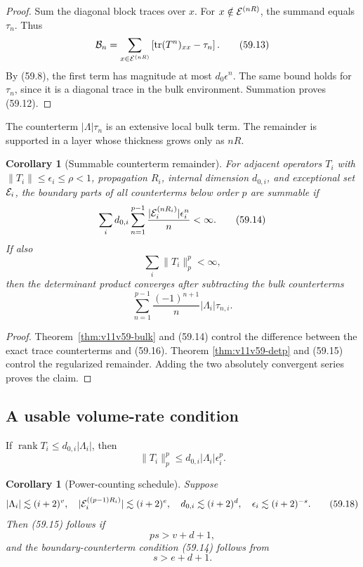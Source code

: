\documentclass[11pt]{article}
\newtheorem{corollary}[theorem]{Corollary}
\begin{document}
\begin{proof}
Sum the diagonal block traces over \(x\).  For
\(x\notin{\cal E}^{(nR)}\), the summand equals \(\tau_n\).
Thus
\[
 {\cal B}_n
 =\sum_{x\in{\cal E}^{(nR)}}
   \left[\operatorname{tr}(T^n)_{xx}-\tau_n\right].           \tag{59.13}
\]
By (59.8), the first term has magnitude at most
\(d_0\epsilon^n\).  The same bound holds for \(\tau_n\), since it is a
diagonal trace in the bulk environment.  Summation proves (59.12).
\end{proof}

The counterterm \(|\Lambda|\tau_n\) is an extensive local bulk term.
The remainder is supported in a layer whose thickness grows only as
\(nR\).

\begin{corollary}[Summable counterterm remainder]
\label{cor:v11v59-summable}
For adjacent operators \(T_i\) with
\(\lVert T_i\rVert\le\epsilon_i\le\rho<1\), propagation \(R_i\),
internal dimension \(d_{0,i}\), and exceptional set \({\cal E}_i\),
the boundary parts of all counterterms below order \(p\) are summable
if
\[
 \sum_i d_{0,i}\sum_{n=1}^{p-1}
       \frac{|{\cal E}_i^{(nR_i)}|\epsilon_i^n}{n}<\infty.    \tag{59.14}
\]
If also
\[
                              \sum_i\lVert T_i\rVert_p^p<\infty,\tag{59.15}
\]
then the determinant product converges after subtracting the bulk
counterterms
\[
                 \sum_{n=1}^{p-1}
                   \frac{(-1)^{n+1}}n|\Lambda_i|\tau_{n,i}.  \tag{59.16}
\]
\end{corollary}

\begin{proof}
Theorem~\ref{thm:v11v59-bulk} and (59.14) control the difference
between the exact trace counterterms and (59.16).  Theorem
\ref{thm:v11v59-detp} and (59.15) control the regularized remainder.
Adding the two absolutely convergent series proves the claim.
\end{proof}

\subsection{A usable volume-rate condition}

If \(\operatorname{rank}T_i\le d_{0,i}|\Lambda_i|\), then
\[
                 \lVert T_i\rVert_p^p
             \le d_{0,i}|\Lambda_i|\epsilon_i^p.              \tag{59.17}
\]

\begin{corollary}[Power-counting schedule]
\label{cor:v11v59-rate}
Suppose
\[
 |\Lambda_i|\lesssim(i+2)^v,\quad
 |{\cal E}_i^{((p-1)R_i)}|\lesssim(i+2)^e,\quad
 d_{0,i}\lesssim(i+2)^d,\quad
 \epsilon_i\lesssim(i+2)^{-s}.                               \tag{59.18}
\]
Then (59.15) follows if
\[
                              ps>v+d+1,                       \tag{59.19}
\]
and the boundary-counterterm condition (59.14) follows from
\[
                              s>e+d+1.                        \tag{59.20}
\]
\end{corollary}
\end{document}
